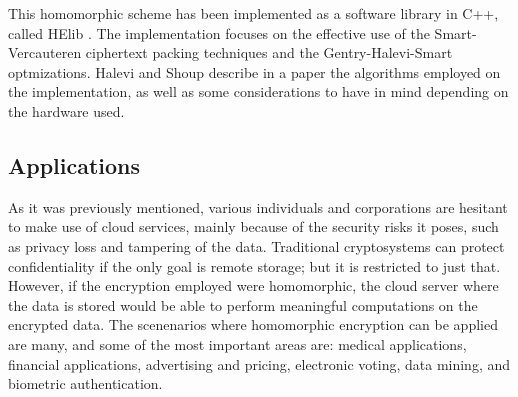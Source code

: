 This homomorphic scheme has been implemented as a software library in C++, called HElib \cite{helib}. The implementation focuses on the effective use of the Smart-Vercauteren ciphertext packing techniques and the Gentry-Halevi-Smart optmizations. Halevi and Shoup \cite{cryptoeprint:2014:106} describe in a paper the algorithms employed on the implementation, as well as some considerations to have in mind depending on the hardware used.

\subsection{Applications}

As it was previously mentioned, various individuals and corporations are hesitant to make use of cloud services, mainly because of the security risks it poses, such as privacy loss and tampering of the data. Traditional cryptosystems can protect confidentiality if the only goal is remote storage; but it is restricted to just that. However, if the encryption employed were homomorphic, the cloud server where the data is stored would be able to perform meaningful computations on the encrypted data.  The scenenarios where homomorphic encryption can be applied are many, and some of the most important areas are: medical applications, financial applications, advertising and pricing, electronic voting, data mining, and biometric authentication.

